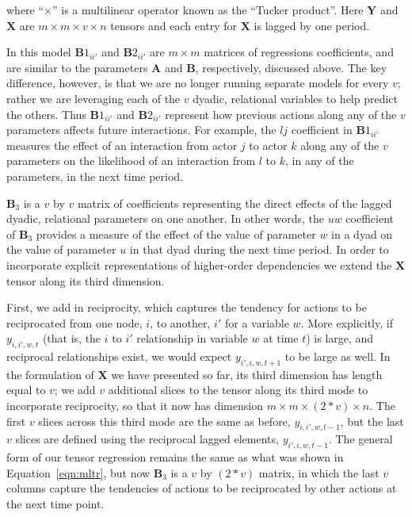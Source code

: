 \documentclass[3p,times,twocolumn,authoryear,12pt]{elsarticle}
\newcommand{\bl}[1]{{\mathbf #1}}
\begin{document}
\noindent where ``$\times$'' is a multilinear operator known as the ``Tucker product''. Here $\bl Y$ and $\bl X$ are $m \times m \times v \times n$ tensors and each entry for $\bl X$ is lagged by one period. 

In this model $\bl B1_{ii'}$ and $\bl B2_{ii'}$ are $m \times m$ matrices of regressions coefficients, and are similar to the parameters $\bl A$ and $\bl B$, respectively, discussed above. The key difference, however, is that we are no longer running separate models for every $v$; rather we are leveraging each of the $v$ dyadic, relational variables to help predict the others. Thus $\bl B1_{ii'}$ and $\bl B2_{ii'}$ represent how previous actions along any of the $v$ parameters affects future interactions. For example, the $l j$ coefficient in $\bl B1_{ii'}$ measures the effect of an interaction from actor $j$ to actor $k$ along any of the $v$ parameters on the likelihood of an interaction from $l$ to $k$, in any of the parameters, in the next time period.

$\bl B_3$ is a $v$ by $v$ matrix of coefficients representing the direct effects of the lagged dyadic, relational parameters on one another. In other words, the $u w$ coefficient of $\bl B_3$ provides a measure of the effect of the value of parameter $w$ in a dyad on the value of parameter $u$ in that dyad during the next time period. In order to incorporate explicit representations of higher-order dependencies we extend the $\bl X$ tensor along its third dimension. 

First, we add in reciprocity, which captures the tendency for actions to be reciprocated from one node, $i$, to another, $i'$ for a variable $w$. More explicitly, if $y_{i,i',w,t}$ (that is, the $i$ to $i'$ relationship in variable $w$ at time $t$) is large, and reciprocal relationships exist, we would expect $y_{i',i,w,t+1}$ to be large as well. In the formulation of $\bl X$ we have presented so far, its third dimension has length equal to $v$; we add $v$ additional slices to the tensor along its third mode to incorporate reciprocity, so that it now has dimension $m \times m \times (2*v) \times n$. The first $v$ slices across this third mode are the same as before, $y_{i,i',w,t-1}$, but the last $v$ slices are defined using the reciprocal lagged elements, $y_{i',i,w,t-1}$. The general form of our tensor regression remains the same as what was shown in Equation~\ref{eqn:mltr}, but now $\bl B_3$ is a $v$ by $(2*v)$ matrix, in which the last $v$ columns capture the tendencies of actions to be reciprocated by other actions at the next time point.
\end{document}
